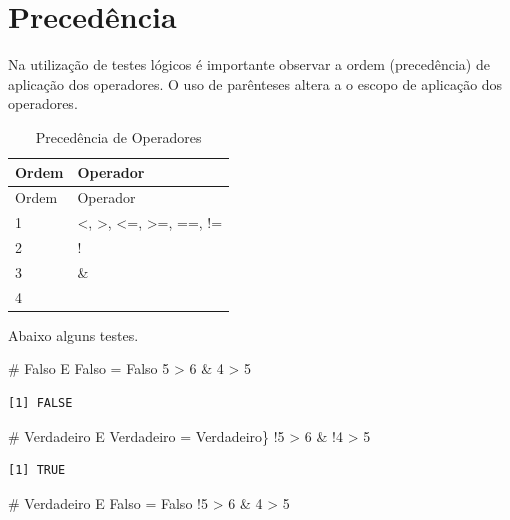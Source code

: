 \documentclass[
  letterpaper,
  DIV=11,
  numbers=noendperiod]{scrreprt}
\newenvironment{Shaded}{\begin{snugshade}}{\end{snugshade}}
\newcommand{\CommentTok}[1]{\textcolor[rgb]{0.37,0.37,0.37}{#1}}
\newcommand{\DecValTok}[1]{\textcolor[rgb]{0.68,0.00,0.00}{#1}}
\newcommand{\SpecialCharTok}[1]{\textcolor[rgb]{0.37,0.37,0.37}{#1}}
\begin{document}
\hypertarget{preceduxeancia}{%
\section{Precedência}\label{preceduxeancia}}

Na utilização de testes lógicos é importante observar a ordem
(precedência) de aplicação dos operadores. O uso de parênteses altera a
o escopo de aplicação dos operadores.

\begin{longtable}[]{@{}ll@{}}
\caption{Precedência de Operadores}\tabularnewline
\toprule()
Ordem & Operador \\
\midrule()
\endfirsthead
\toprule()
Ordem & Operador \\
\midrule()
\endhead
1 & \textless, \textgreater, \textless=, \textgreater=, ==, != \\
2 & ! \\
3 & \& \\
4 & \textbar{} \\
\bottomrule()
\end{longtable}

Abaixo alguns testes.

\begin{Shaded}
\begin{Highlighting}[]
\CommentTok{\# Falso E Falso = Falso}
\DecValTok{5} \SpecialCharTok{\textgreater{}} \DecValTok{6} \SpecialCharTok{\&} \DecValTok{4} \SpecialCharTok{\textgreater{}} \DecValTok{5}
\end{Highlighting}
\end{Shaded}

\begin{verbatim}
[1] FALSE
\end{verbatim}

\begin{Shaded}
\begin{Highlighting}[]
\CommentTok{\# Verdadeiro E Verdadeiro = Verdadeiro\}}
\SpecialCharTok{!}\DecValTok{5} \SpecialCharTok{\textgreater{}} \DecValTok{6} \SpecialCharTok{\&} \SpecialCharTok{!}\DecValTok{4} \SpecialCharTok{\textgreater{}} \DecValTok{5}
\end{Highlighting}
\end{Shaded}

\begin{verbatim}
[1] TRUE
\end{verbatim}

\begin{Shaded}
\begin{Highlighting}[]
\CommentTok{\# Verdadeiro E Falso = Falso}
\SpecialCharTok{!}\DecValTok{5} \SpecialCharTok{\textgreater{}} \DecValTok{6} \SpecialCharTok{\&} \DecValTok{4} \SpecialCharTok{\textgreater{}} \DecValTok{5}
\end{Highlighting}
\end{Shaded}
\end{document}
